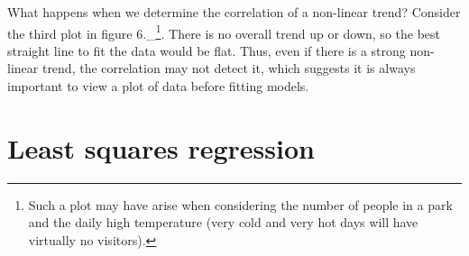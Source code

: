 \begin{example}
[Do an example.]
\end{example}

What happens when we determine the correlation of a non-linear trend? Consider the third plot in figure 6.\_\footnote{Such a plot may have arise when considering the number of people in a park and the daily high temperature (very cold and very hot days will have virtually no visitors).}. There is no overall trend up or down, so the best straight line to fit the data would be flat. Thus, even if there is a strong non-linear trend, the correlation may not detect it, which suggests it is always important to view a plot of data before fitting models. \\

\section{Least squares regression}

